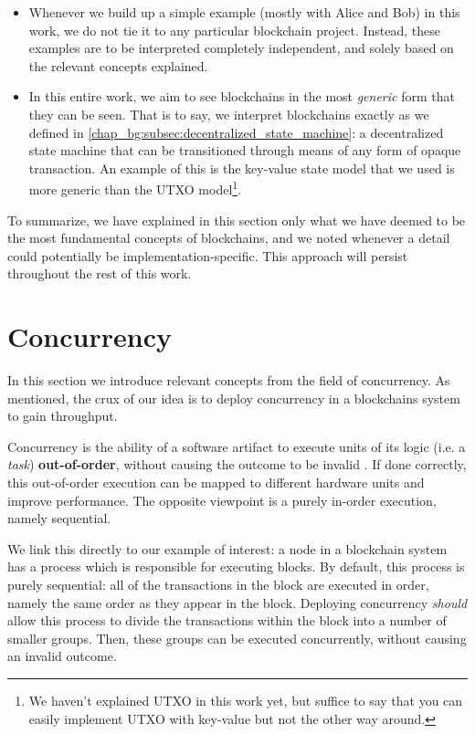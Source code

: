 \begin{itemize}
	\item Whenever we build up a simple example (mostly with Alice and Bob) in this work, we do not
	tie it to any particular blockchain project. Instead, these examples are to be interpreted
	completely independent, and solely based on the relevant concepts explained.
	\item In this entire work, we aim to see blockchains in the most \textit{generic} form that they
	can be seen. That is to say, we interpret blockchains exactly as we defined in
	\ref{chap_bg:subsec:decentralized_state_machine}: a decentralized state machine that can be
	transitioned through means of any form of opaque transaction. An example of this is the
	key-value state model that we used is more generic than the UTXO model\footnote{We haven't
	explained UTXO in this work yet, but suffice to say that you can easily implement UTXO with
	key-value but not the other way around.}.
	\end{itemize}

To summarize, we have explained in this section only what we have deemed to be the most fundamental
concepts of blockchains, and we noted whenever a detail could potentially be
implementation-specific. This approach will persist throughout the rest of this work.

\section{Concurrency} \label{chap_bg:sec:concurrency}

In this section we introduce relevant concepts from the field of concurrency. As mentioned, the crux
of our idea is to deploy concurrency in a blockchains system to gain throughput.

Concurrency is the ability of a software artifact to execute units of its logic (i.e. a
\textit{task}) \textbf{out-of-order}, without causing the outcome to be invalid
\cite{lamportTimeClocksOrdering1978}. If done correctly, this out-of-order execution can be mapped
to different hardware units and improve performance. The opposite viewpoint is a purely in-order
execution, namely sequential.

We link this directly to our example of interest: a node in a blockchain system has a process
which is responsible for executing blocks. By default, this process is purely sequential: all of the
transactions in the block are executed in order, namely the same order as they appear in the block.
Deploying concurrency \textit{should} allow this process to divide the transactions within the block
into a number of smaller groups. Then, these groups can be executed concurrently, without causing an
invalid outcome.


